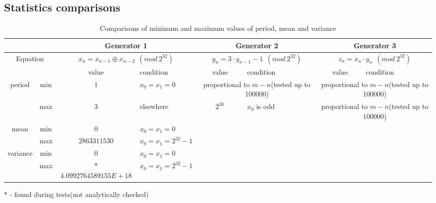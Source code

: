 \documentclass[a4paper,10pt]{article}
\newcommand{\xmark}{\ding{55}}%
\begin{document}
\begin{landscape}
\appendix
\section{Statistics comparisons}
\begin{table}[ht!]
\centering
\caption{Comparisons of minimum and maximum values of period, mean and variance}
\label{tab:comparisons}
  \begin{tabular}{cc|c|l|c|l|c|l|}
  \cline{3-8}
						  &     & \multicolumn{2}{|c|}{Generator 1} & \multicolumn{2}{|c|}{Generator 2} & \multicolumn{2}{|c|}{Generator 3} \\ \hline
  \multicolumn{2}{|c|}{Equation}                        & \multicolumn{2}{|c|}{$x_n = x_{n-1} \oplus x_{n-2}\ \ (mod\ 2^{32})$} & \multicolumn{2}{|c|}{$y_n = 3 \cdot y_{n-1} - 1\ \ (mod\ 2^{32})$} & \multicolumn{2}{|c|}{$z_n = x_n \cdot y_n\ \ (mod\ 2^{32})$} \\ \hline
  \multicolumn{2}{|c|}{}                                & value & condition & value & condition & value & condition \\ \hline \hline
  \multicolumn{1}{|c|}{\multirow{2}{*}{period}}   & min & $1$ & $x_0=x_1=0$                               &  \multicolumn{2}{|c|}{proportional to $m-n$(tested up to 100000)} & \multicolumn{2}{|c|}{proportional to $m-n$(tested up to 100000)}  \\ \cline{2-8} 
  \multicolumn{1}{|c|}{}                          & max & $3$ & elsewhere                                 & $2^{30}$ & $x_0$ is odd      & \multicolumn{2}{|c|}{proportional to $m-n$(tested up to 100000)}  \\ \hline
  \multicolumn{1}{|c|}{\multirow{2}{*}{mean}}     & min & $0$ & $x_0=x_1=0$                               & \multicolumn{2}{|c|}{\xmark} & \multicolumn{2}{|c|}{\xmark} \\ \cline{2-8} 
  \multicolumn{1}{|c|}{}                          & max & $2863311530$ & $x_0=x_1=2^{32}-1$               & \multicolumn{2}{|c|}{\xmark} & \multicolumn{2}{|c|}{\xmark} \\ \hline
  \multicolumn{1}{|c|}{\multirow{2}{*}{variance}} & min & $0$ & $x_0=x_1=0$                               & \multicolumn{2}{|c|}{\xmark} & \multicolumn{2}{|c|}{\xmark} \\ \cline{2-8} 
  \multicolumn{1}{|c|}{}                          & max & *$4.0992764589155E+18$ & $x_0=x_1=2^{32}-1$     & \multicolumn{2}{|c|}{\xmark} & \multicolumn{2}{|c|}{\xmark} \\ \hline
  \end{tabular}
\end{table}
* - found during tests(not analytically checked)

\end{landscape}
\end{document}
